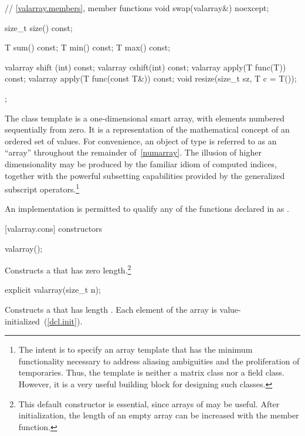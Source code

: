 \begin{codeblock}
{{    // \ref{valarray.members}, member functions
    void swap(valarray&) noexcept;

    size_t size() const;

    T sum() const;
    T min() const;
    T max() const;

    valarray shift (int) const;
    valarray cshift(int) const;
    valarray apply(T func(T)) const;
    valarray apply(T func(const T&)) const;
    void resize(size_t sz, T c = T());
  };
}
\end{codeblock}

\pnum
The
class template
is a
one-dimensional smart array, with elements numbered sequentially from zero.
It is a representation of the mathematical concept
of an ordered set of values.
For convenience, an object of type  is referred
to as an ``array'' throughout the remainder of~\ref{numarray}.
The illusion of higher dimensionality
may be produced by the familiar idiom of computed indices, together
with the powerful subsetting capabilities provided
by the generalized subscript operators.\footnote{The intent is to specify
an array template that has the minimum functionality
necessary to address aliasing ambiguities and the proliferation of
temporaries.
Thus, the
template is neither a
matrix class nor a field class.
However, it is a very useful building block for designing such classes.}

\pnum
An implementation is permitted to qualify any of the functions declared in
as
.

[valarray.cons]{ constructors}

%
\begin{itemdecl}
valarray();
\end{itemdecl}

\begin{itemdescr}
\pnum
\effects
Constructs a 
that has zero length.\footnote{This default constructor is essential,
since arrays of
may be useful.
After initialization, the length of an empty array can be increased with the
member function.}
\end{itemdescr}

%
\begin{itemdecl}
explicit valarray(size_t n);
\end{itemdecl}

\begin{itemdescr}
\pnum
\effects
Constructs a  that has length .
Each element of the array is value-initialized~(\ref{dcl.init}).
\end{itemdescr}

